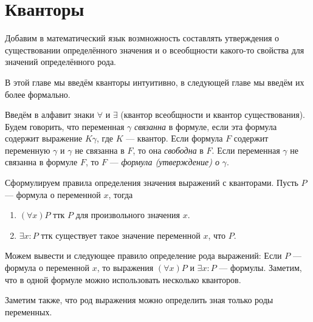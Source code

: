 \section{Кванторы}

Добавим в математический язык возмножность составлять утверждения о существовании
определённого значения и о всеобщности какого-то свойства для значений
определённого рода.

В этой главе мы введём кванторы интуитивно, в следующей главе
мы введём их более формально.

Введём в алфавит знаки $\forall$ и $\exists$ (квантор всеобщности и
квантор существования). Будем говорить, что переменная $\gamma$
{\it связанна} в формуле, если эта формула содержит выражение $K\gamma$,
где $K$ --- квантор. Если формула $F$ содержит переменную $\gamma$ и $\gamma$
не связанна в $F$, то она {\it свободна} в $F$. Если переменная $\gamma$
не связанна в формуле $F$, то $F$ --- {\it формула (утверждение) о} $\gamma$.

Сформулируем правила определения значения выражений с кванторами.
Пусть $P$ --- формула о переменной $x$, тогда
\begin{enumerate}
	\item{}$(\forall x)P$ ттк $P$ для произвольного значения $x$.
	\item{}$\exists x:P$ ттк существует такое значение переменной $x$, что $P$.
\end{enumerate}

Можем вывести и следующее правило определение рода выражений:
Если $P$ --- формула о переменной $x$,
то выражения $(\forall x)P$ и ${\exists x:P}$ --- формулы.
Заметим, что в одной формуле можно использовать несколько кванторов.

Заметим также, что род выражения можно определить зная только роды переменных.

